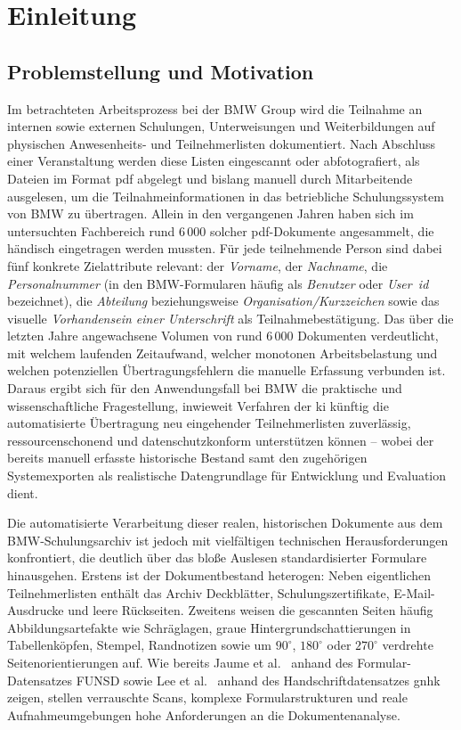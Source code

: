 \chapter{Einleitung}
\label{chap:einleitung}

\section{Problemstellung und Motivation}
\label{sec:problemstellung}

Im betrachteten Arbeitsprozess bei der BMW Group wird die Teilnahme an internen sowie externen Schulungen, Unterweisungen und Weiterbildungen auf physischen Anwesenheits- und Teilnehmerlisten dokumentiert. Nach Abschluss einer Veranstaltung werden diese Listen eingescannt oder abfotografiert, als Dateien im Format \ac{pdf} abgelegt und bislang manuell durch Mitarbeitende ausgelesen, um die Teilnahmeinformationen in das betriebliche Schulungssystem von BMW zu übertragen. Allein in den vergangenen Jahren haben sich im untersuchten Fachbereich rund 6\,000 solcher \ac{pdf}-Dokumente angesammelt, die händisch eingetragen werden mussten. Für jede teilnehmende Person sind dabei fünf konkrete Zielattribute relevant: der \emph{Vorname}, der \emph{Nachname}, die \emph{Personalnummer} (in den BMW-Formularen häufig als \emph{Benutzer} oder \emph{User~\ac{id}} bezeichnet), die \emph{Abteilung} beziehungsweise \emph{Organisation/Kurzzeichen} sowie das visuelle \emph{Vorhandensein einer Unterschrift} als Teilnahmebestätigung. Das über die letzten Jahre angewachsene Volumen von rund 6\,000 Dokumenten verdeutlicht, mit welchem laufenden Zeitaufwand, welcher monotonen Arbeitsbelastung und welchen potenziellen Übertragungsfehlern die manuelle Erfassung verbunden ist. Daraus ergibt sich für den Anwendungsfall bei BMW die praktische und wissenschaftliche Fragestellung, inwieweit Verfahren der \ac{ki} künftig die automatisierte Übertragung neu eingehender Teilnehmerlisten zuverlässig, ressourcenschonend und datenschutzkonform unterstützen können -- wobei der bereits manuell erfasste historische Bestand samt den zugehörigen Systemexporten als realistische Datengrundlage für Entwicklung und Evaluation dient.

Die automatisierte Verarbeitung dieser realen, historischen Dokumente aus dem BMW-Schulungsarchiv ist jedoch mit vielfältigen technischen Herausforderungen konfrontiert, die deutlich über das bloße Auslesen standardisierter Formulare hinausgehen. Erstens ist der Dokumentbestand heterogen: Neben eigentlichen Teilnehmerlisten enthält das Archiv Deckblätter, Schulungszertifikate, E-Mail-Ausdrucke und leere Rückseiten. Zweitens weisen die gescannten Seiten häufig Abbildungsartefakte wie Schräglagen, graue Hintergrundschattierungen in Tabellenköpfen, Stempel, Randnotizen sowie um $90^\circ$, $180^\circ$ oder $270^\circ$ verdrehte Seitenorientierungen auf. Wie bereits Jaume et al.~\cite{Jaume2019FUNSD} anhand des Formular-Datensatzes FUNSD sowie Lee et al.~\cite{Lee2021GNHK} anhand des Handschriftdatensatzes \ac{gnhk} zeigen, stellen verrauschte Scans, komplexe Formularstrukturen und reale Aufnahmeumgebungen hohe Anforderungen an die Dokumentenanalyse.

